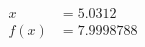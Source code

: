 \documentclass[preview]{standalone}
\begin{document}
\begin{align*}
x &= 5.0312\\f(x) &= 7.9998788
\end{align*}
\end{document}
